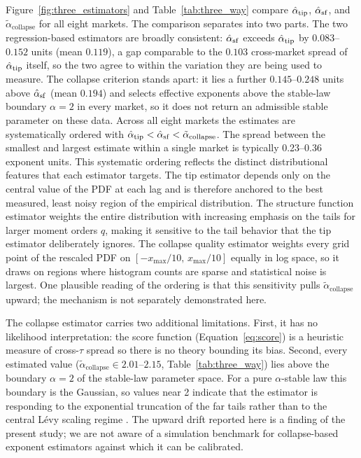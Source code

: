\documentclass[conference]{IEEEtran}
\begin{document}
Figure~\ref{fig:three_estimators} and Table~\ref{tab:three_way} compare
$\hat{\alpha}_{\mathrm{tip}}$,
$\hat{\alpha}_{\mathrm{sf}}$, and $\tilde{\alpha}_{\mathrm{collapse}}$ for all eight markets.
The comparison separates into two parts. The two regression-based estimators
are broadly consistent: $\hat{\alpha}_{\mathrm{sf}}$ exceeds
$\hat{\alpha}_{\mathrm{tip}}$ by $0.083$--$0.152$ units (mean $0.119$), a gap
comparable to the $0.103$ cross-market spread of $\hat{\alpha}_{\mathrm{tip}}$
itself, so the two agree to within the variation they are being used to
measure. The collapse criterion stands apart: it lies a further
$0.145$--$0.248$ units above $\hat{\alpha}_{\mathrm{sf}}$ (mean $0.194$) and
selects effective exponents above the stable-law boundary
$\alpha=2$ in every market, so it does not return an admissible stable
parameter on these data.
Across all eight markets the estimates are systematically ordered with
$\hat{\alpha}_{\mathrm{tip}} < \hat{\alpha}_{\mathrm{sf}} < \tilde{\alpha}_{\mathrm{collapse}}$.
The spread between the smallest and largest estimate within a single market is
typically 0.23--0.36 exponent units.
This systematic ordering reflects the distinct
distributional features that each estimator targets.
The tip estimator depends only on the central value of the PDF at each lag
and is therefore anchored to the best measured, least noisy region of the
empirical distribution.
The structure function estimator weights the entire distribution with
increasing emphasis on the tails for larger moment orders $q$, making it
sensitive to the tail behavior that the tip estimator deliberately ignores.
The collapse quality estimator weights every grid point of the rescaled PDF
on $[-x_{\max}/10,\,x_{\max}/10]$ equally in log space, so it draws on regions
where histogram counts are sparse and statistical noise is largest. One
plausible reading of the ordering is that this sensitivity pulls
$\tilde{\alpha}_{\mathrm{collapse}}$ upward; the mechanism is not separately
demonstrated here.

The collapse estimator carries two additional limitations.
First, it has no likelihood interpretation: the score function
(Equation~\eqref{eq:score}) is a heuristic measure of
cross-$\tau$ spread so there is no theory bounding its bias.
Second, every estimated value ($\tilde{\alpha}_{\mathrm{collapse}}
\in 2.01$--$2.15$, Table~\ref{tab:three_way}) lies above the
boundary $\alpha=2$ of the stable-law parameter space.
For a pure $\alpha$-stable law this boundary is the Gaussian, so values
near 2 indicate that the estimator is responding to the exponential
truncation of the far tails rather than to the central Lévy scaling
regime \cite{MantegnaStanley1994,Weron2001}.
The upward drift reported here is a finding of the present study; we are
not aware of a simulation benchmark for collapse-based exponent estimators
against which it can be calibrated.
\end{document}
